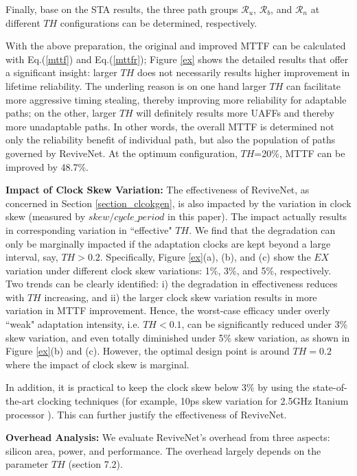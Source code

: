 Finally, base on the STA results, the three path groups $\mathcal{R}_u$, $\mathcal{R}_b$, and
$\mathcal{R}_n$ at different $TH$ configurations can be determined, respectively.

With the above preparation, the original and improved MTTF can be calculated with Eq.(\ref{mttf})
and Eq.(\ref{mttfr}); Figure \ref{ex} shows the detailed results that offer a significant insight: larger $TH$ does not necessarily results higher improvement in lifetime reliability.
The underling reason is on one hand larger $TH$ can facilitate more aggressive timing stealing, thereby
improving more reliability for adaptable paths; on the other, larger $TH$ will definitely results
more UAFFs and thereby more unadaptable paths. In other words, the overall MTTF is determined not
only the reliability benefit of individual path, but also the population of paths governed by
ReviveNet. At the optimum configuration, $TH$=20\%, MTTF can be improved by 48.7\%.

\textbf{Impact of Clock Skew Variation:} The effectiveness of ReviveNet, as concerned in Section \ref{section_clcokgen}, is also impacted by the variation in clock skew (measured by $skew/cycle\_period$ in this paper). The impact actually results in corresponding variation in ``effective" $TH$. We find that the degradation can only be marginally impacted if the adaptation clocks are kept beyond a large interval, say, $TH>0.2$. Specifically, Figure \ref{ex}(a), (b), and (c) show the $EX$ variation under different clock skew variations: 1\%, 3\%, and 5\%, respectively. Two trends can be clearly identified: i) the degradation in effectiveness  reduces with  $TH$ increasing, and ii) the larger clock skew variation results in more variation in MTTF improvement. Hence, the worst-case efficacy under overly ``weak" adaptation intensity, i.e. $TH<0.1$, can be significantly reduced under 3\% skew variation, and even totally diminished under 5\% skew variation, as shown in Figure \ref{ex}(b) and (c). However, the optimal design point is around $TH=0.2$ where the impact of clock skew is marginal.

In addition, it is practical to keep the clock skew below 3\% by using the state-of-the-art clocking techniques (for example, 10ps skew variation for 2.5GHz Itanium processor \cite{Itanium_clock05}). This can further justify the effectiveness of ReviveNet.



\textbf{Overhead Analysis:} We evaluate ReviveNet's overhead from three aspects: silicon area, power, and performance. The
overhead largely depends on the parameter $TH$ (section 7.2).

